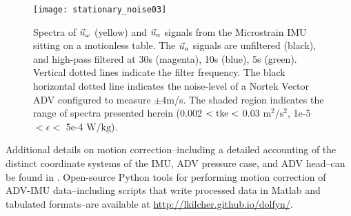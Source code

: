 \begin{figure}
  \centering
  \label{fig:stationary_noise}
  \texttt{[image: stationary\_noise03]}
  \caption{Spectra of $\vec{u}_\omega$ (yellow) and $\vec{u}_a$ signals from the Microstrain IMU sitting on a motionless table. The $\vec{u}_a$ signals are unfiltered (black), and high-pass filtered at 30s (magenta), 10s (blue), 5s (green). Vertical dotted lines indicate the filter frequency. The black horizontal dotted line indicates the noise-level of a Nortek Vector ADV configured to measure $\pm$4m/s. The shaded region indicates the range of spectra presented herein (0.002 $< \mathrm{tke} <$ 0.03 $\mathrm{m^2/s^2}$, 1e-5 $< \epsilon <$ 5e-4 $\mathrm{W/kg}$).}
\end{figure}

Additional details on motion correction--including a detailed accounting of the distinct coordinate systems of the IMU, ADV pressure case, and ADV head--can be found in \cite{Kilcher++2016}. Open-source Python tools for performing motion correction of ADV-IMU data--including scripts that write processed data in Matlab and tabulated formats--are available at \url{http://lkilcher.github.io/dolfyn/}.

